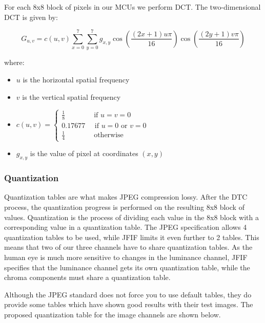 \begin{infobox}
For each 8x8 block of pixels in our MCUs we perform DCT. The two-dimensional DCT is given by:

$$ G_{u,v} = c(u,v)\sum_{x=0}^{7}\sum_{y=0}^{7}g_{x,y}\cos{\left(\frac{(2x+1)u\pi}{16}\right)}\cos{\left(\frac{(2y+1)v\pi}{16}\right)} $$

where:
\begin{itemize}
	\item $u$ is the horizontal spatial frequency 
	\item $v$ is the vertical spatial frequency 
	\item $c(u,v) = \begin{cases}\frac{1}{8} \quad \quad \quad \quad\text{if } u=v=0\\ 
	                             0.17677 \quad \text{ if } u = 0 \text{ or } v = 0\\
	                             \frac{1}{4} \quad \quad \quad \quad\text{otherwise}
	                             \end{cases} $
    \item $g_{x,y}$ is the value of pixel at coordinates $(x,y)$ 
\end{itemize}

\vspace{4mm}
\subsubsection{Quantization}
\vspace{-2.5mm}
Quantization tables are what makes JPEG compression lossy. 
After the DTC process, the quantization progress is performed on the resulting 8x8 block of values.
Quantization is the process of dividing each value in the 8x8 block with a corresponding value in a quantization table. 
The JPEG specification allows 4 quantization tables to be used, while JFIF limits it even further to 2 tables. 
This means that two of our three channels have to share quantization tables. 
As the human eye is much more sensitive to changes in the luminance channel, JFIF specifies that the luminance channel gets its own quantization table, while the chroma components must share a quantization table.

Although the JPEG standard does not force you to use default tables, they do provide some tables which have shown good results with their test images. The proposed quantization table for the image channels are shown below.


\end{infobox}
